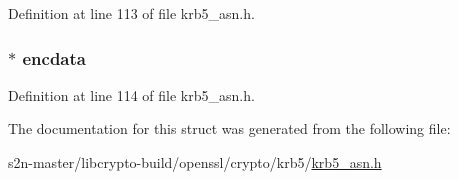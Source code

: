 Definition at line 113 of file krb5\+\_\+asn.\+h.

\subsubsection[{\texorpdfstring{encdata}{encdata}}]{ $\ast$ encdata}\hypertarget{structkrb5__tktbody__st_a4cbd115849d6be79f117e6f5c1dec0ac}{}\label{structkrb5__tktbody__st_a4cbd115849d6be79f117e6f5c1dec0ac}


Definition at line 114 of file krb5\+\_\+asn.\+h.



The documentation for this struct was generated from the following file\+:\begin{DoxyCompactItemize}
\item 
s2n-\/master/libcrypto-\/build/openssl/crypto/krb5/\hyperlink{crypto_2krb5_2krb5__asn_8h}{krb5\+\_\+asn.\+h}\end{DoxyCompactItemize}
